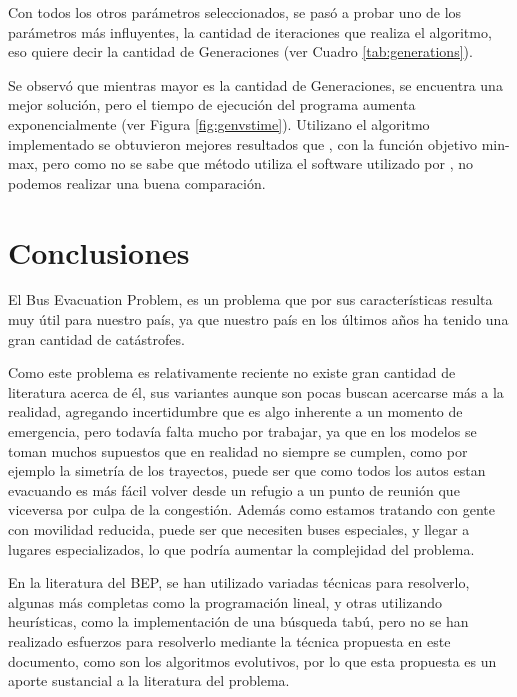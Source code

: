 \documentclass[letter, 10pt]{article}
\begin{document}
Con todos los otros parámetros seleccionados, se pasó a probar uno de los parámetros más influyentes, la cantidad de iteraciones que realiza el algoritmo, eso quiere decir la cantidad de Generaciones (ver Cuadro \ref{tab:generations}).

Se observó que mientras mayor es la cantidad de Generaciones, se encuentra una mejor solución, pero el tiempo de ejecución del programa aumenta exponencialmente (ver Figura \ref{fig:genvstime}). Utilizano el algoritmo implementado se obtuvieron mejores resultados que \cite{bish2011planning}, con la función objetivo min-max, pero como no se sabe que método utiliza el software utilizado por \cite{bish2011planning}, no podemos realizar una buena comparación.



\section{Conclusiones}

El Bus Evacuation Problem, es un problema que por sus características resulta muy útil para nuestro país, ya que nuestro país en los últimos años ha tenido una gran cantidad de catástrofes. 

Como este problema es relativamente reciente no existe gran cantidad de literatura acerca de él, sus variantes aunque son pocas buscan acercarse más a la realidad, agregando incertidumbre que es algo inherente a un momento de emergencia, pero todavía falta mucho por trabajar, ya que en los modelos se toman muchos supuestos que en realidad no siempre se cumplen, como por ejemplo la simetría de los trayectos, puede ser que como todos los autos estan evacuando es más fácil volver desde un refugio a un punto de reunión que viceversa por culpa de la congestión. Además como estamos tratando con gente con movilidad reducida, puede ser que necesiten buses especiales, y llegar a lugares especializados, lo que podría aumentar la complejidad del problema.

En la literatura del BEP, se han utilizado variadas técnicas para resolverlo, algunas más completas como la programación lineal, y otras utilizando heurísticas, como la implementación de una búsqueda tabú, pero no se han realizado esfuerzos para resolverlo mediante la técnica propuesta en este documento, como son los algoritmos evolutivos, por lo que esta propuesta es un aporte sustancial a la literatura del problema.
\end{document}

